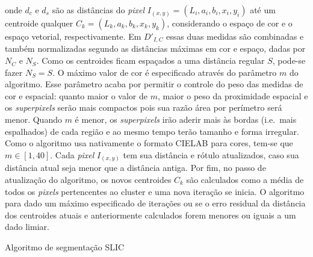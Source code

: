 \noindent onde $d_c$ e $d_s$ são as distâncias do \textit{pixel} $I_{(x,y)} =
(L_i, a_i, b_i, x_i, y_i)$ até um centroide qualquer $C_k = (L_k, a_k,
b_k, x_k, y_k)$, considerando o espaço de cor e o espaço vetorial,
respectivamente. Em $D'_{I,C}$ essas duas medidas são combinadas e
também normalizadas segundo as distâncias máximas em cor e espaço,
dadas por $N_C$ e $N_S$. Como os centroides ficam espaçados a uma
distância regular $S$, pode-se fazer $N_S = S$. O máximo valor de
cor é especificado através do parâmetro $m$ do algoritmo. Esse parâmetro acaba por
permitir o controle do peso das medidas de cor e espacial: quanto
maior o valor de $m$, maior o peso da proximidade espacial e os
\textit{superpixels} serão mais compactos pois sua razão área por perímetro
será menor. Quando $m$ é menor, os \textit{superpixels} irão aderir
mais às bordas (i.e.\ mais espalhados) de cada região e ao mesmo tempo
terão tamanho e forma irregular. Como o algoritmo usa nativamente o
formato CIELAB para cores, tem-se que $m \in [1,
40]$. Cada \textit{pixel} $I_{(x,y)}$ tem sua distância e rótulo
atualizados, caso sua distância atual seja menor que a distância
antiga. Por fim, no passo de atualização do algoritmo, os novos
centroides $C_k$ são calculados como a média de todos os
\textit{pixels} pertencentes ao cluster e uma nova iteração se inicia. O
algoritmo para dado um máximo especificado de iterações ou se o erro
residual da distância dos centroides atuais e anteriormente calculados
forem menores ou iguais a um dado limiar.

\begin{espacosimples}
\begin{algorithm2e}[H]
  \caption{Algoritmo de segmentação SLIC}
  \label{algo:slic}
  \SetAlgoLined



\end{algorithm2e}
\end{espacosimples}

